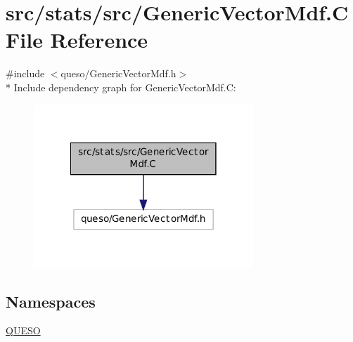 \hypertarget{_generic_vector_mdf_8_c}{\section{src/stats/src/\-Generic\-Vector\-Mdf.C File Reference}
\label{_generic_vector_mdf_8_c}
}
{\ttfamily \#include $<$queso/\-Generic\-Vector\-Mdf.\-h$>$}\\*
Include dependency graph for Generic\-Vector\-Mdf.\-C\-:
\nopagebreak
\begin{figure}[H]
\begin{center}
\leavevmode
\includegraphics[width=234pt]{_generic_vector_mdf_8_c__incl}
\end{center}
\end{figure}
\subsection*{Namespaces}
\begin{DoxyCompactItemize}
\item 
\hyperlink{namespace_q_u_e_s_o}{Q\-U\-E\-S\-O}
\end{DoxyCompactItemize}
